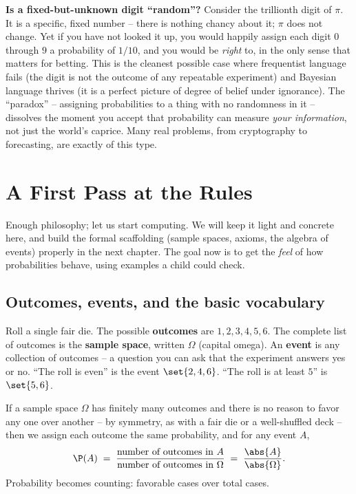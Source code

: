 \begin{paradoxbox}
\textbf{Is a fixed-but-unknown digit ``random''?} Consider the trillionth digit of
$\pi$. It is a specific, fixed number -- there is nothing chancy about it; $\pi$
does not change. Yet if you have not looked it up, you would happily assign each
digit $0$ through $9$ a probability of $1/10$, and you would be \emph{right} to, in
the only sense that matters for betting. This is the cleanest possible case where
frequentist language fails (the digit is not the outcome of any repeatable
experiment) and Bayesian language thrives (it is a perfect picture of degree of
belief under ignorance). The ``paradox'' -- assigning probabilities to a thing with
no randomness in it -- dissolves the moment you accept that probability can measure
\emph{your information}, not just the world's caprice. Many real problems, from
cryptography to forecasting, are exactly of this type.
\end{paradoxbox}

\section{A First Pass at the Rules}
\label{ch01:rules}

Enough philosophy; let us start computing. We will keep it light and concrete here,
and build the formal scaffolding (sample spaces, axioms, the algebra of events)
properly in the next chapter. The goal now is to get the \emph{feel} of how
probabilities behave, using examples a child could check.

\subsection{Outcomes, events, and the basic vocabulary}
\label{ch01:vocab}

Roll a single fair die. The possible \textbf{outcomes} are $1,2,3,4,5,6$. The
complete list of outcomes is the \textbf{sample space}, written $\Omega$ (capital
omega). An \textbf{event} is any collection of outcomes -- a question you can ask
that the experiment answers yes or no. ``The roll is even'' is the event
$\set{2,4,6}$. ``The roll is at least $5$'' is $\set{5,6}$.

\begin{definition}
\label{ch01:def-equally-likely}
If a sample space $\Omega$ has finitely many outcomes and there is no reason to
favor any one over another -- by symmetry, as with a fair die or a well-shuffled
deck -- then we assign each outcome the same probability, and for any event $A$,
\[
  \P(A) \;=\; \frac{\text{number of outcomes in } A}{\text{number of outcomes in } \Omega}
  \;=\; \frac{\abs{A}}{\abs{\Omega}}.
\]
Probability becomes counting: favorable cases over total cases.
\end{definition}

